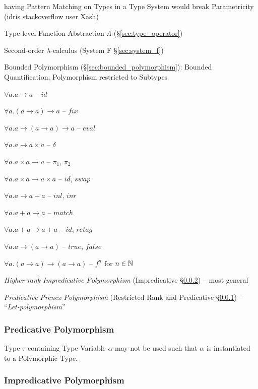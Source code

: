 having Pattern Matching on Types in a Type System would break
Parametricity (idris stackoverflow user Xash) %

Type-level Function Abstraction $\Lambda$ (\S\ref{sec:type_operator})

Second-order $\lambda$-calculus (System F \S\ref{sec:system_f})

Bounded Polymorphism (\S\ref{sec:bounded_polymorphism}): Bounded
Quantification; Polymorphism restricted to Subtypes


\asterism


$\forall a.a \rightarrow a$ -- $id$

$\forall a.(a \rightarrow a) \rightarrow a$ -- $fix$

$\forall a.a \rightarrow (a \rightarrow a) \rightarrow a$ -- $eval$


$\forall a.a \rightarrow a \times a$ -- $\delta$

$\forall a.a \times a \rightarrow a$ -- $\pi_1$, $\pi_2$

$\forall a.a \times a \rightarrow a \times a$ -- $id$, $swap$


$\forall a.a \rightarrow a + a$ -- $inl$, $inr$

$\forall a.a + a \rightarrow a$ -- $match$

$\forall a.a + a \rightarrow a + a$ -- $id$, $retag$


$\forall a.a \rightarrow (a \rightarrow a)$ -- $true$, $false$


$\forall a.(a \rightarrow a) \rightarrow (a \rightarrow a)$ -- $f^n$
for $n \in \mathbb{N}$


\asterism


\emph{Higher-rank Impredicative Polymorphism} (Impredicative
\S\ref{sec:impredicative_polymorphism}) -- most general

\emph{Predicative Prenex Polymorphism} (Restricted Rank and
Predicative \S\ref{sec:predicative_polymorphism}) --
``\emph{Let-polymorphism}''



\subsubsection{Predicative Polymorphism}
\label{sec:predicative_polymorphism}

Type $\tau$ containing Type Variable $\alpha$ may not be used such
that $\alpha$ is instantiated to a Polymorphic Type.



\subsubsection{Impredicative Polymorphism}
\label{sec:impredicative_polymorphism}

